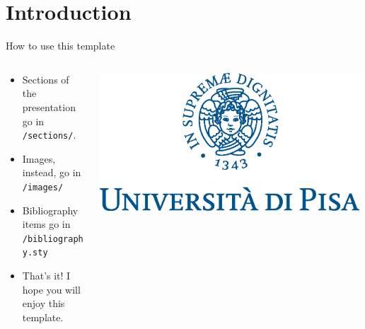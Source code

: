 \section{Introduction}
\begin{frame}{How to use this template}
    \begin{columns}[T]
        \begin{column}{0.65\textwidth}
            \begin{itemize}
                \item Sections of the presentation go in \texttt{/sections/}.
                \item Images, instead, go in \texttt{/images/}
                \item Bibliography items go in \texttt{/bibliography.sty}
                \item That's it! I hope you will enjoy this template.
            \end{itemize}
        \end{column}
        \begin{column}{0.35\textwidth}
            \includegraphics[width=0.99\textwidth]{src/Unipi/marchio_unipi.eps}
        \end{column}
    \end{columns}
\end{frame}